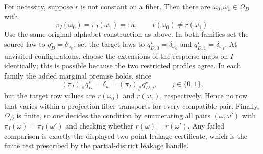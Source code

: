 For necessity, suppose \(r\) is not constant on a fiber.  Then there are \(\omega_0,\omega_1\in\Omega_D\) with
\[
\pi_I(\omega_0)=\pi_I(\omega_1)=:u,
\qquad
r(\omega_0)\ne r(\omega_1).
\]
Use the same original-alphabet construction as above.  In both families set the source law to \(q_D^s=\delta_{\omega_0}\); set the target laws to \(q_{D,0}^\star=\delta_{\omega_0}\) and \(q_{D,1}^\star=\delta_{\omega_1}\).  At unvisited configurations, choose the extensions of the response maps on \(I\) identically; this is possible because the two restricted profiles agree.  In each family the added marginal premise holds, since
\[
(\pi_I)_\#q_D^s
=\delta_u
=(\pi_I)_\#q_{D,j}^\star,
\qquad j\in\{0,1\},
\]
but the target row values are \(r(\omega_0)\) and \(r(\omega_1)\), respectively.  Hence no row that varies within a projection fiber transports for every compatible pair.  Finally, \(\Omega_D\) is finite, so one decides the condition by enumerating all pairs \((\omega,\omega')\) with \(\pi_I(\omega)=\pi_I(\omega')\) and checking whether \(r(\omega)=r(\omega')\).  Any failed comparison is exactly the displayed two-point leakage certificate, which is the finite test prescribed by the partial-district leakage handle.
